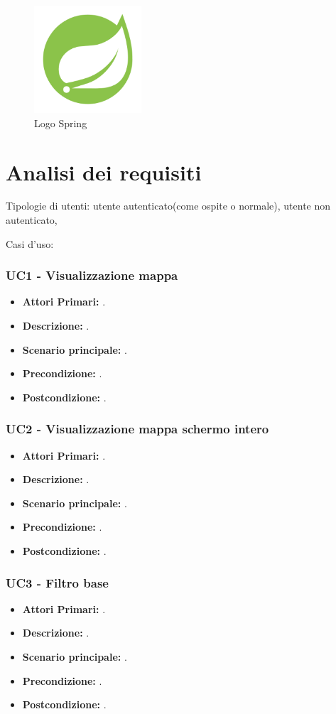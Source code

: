 \begin{figure}[htbp]	
	\centering
	\includegraphics[width=4cm]{immagini/springlogo.png}
	\caption{Logo Spring}
	\label{fig:Logo Spring}
\end{figure}

\newpage

\section{Analisi dei requisiti}
Tipologie di utenti: utente autenticato(come ospite o normale), utente non autenticato, 

Casi d'uso: 

\subsubsection{ UC1 - Visualizzazione mappa}
\begin{itemize}
	\item\textbf{Attori Primari:} .
	\item\textbf{Descrizione:} .
	\item\textbf{Scenario principale:} .
	\item\textbf{Precondizione:} .
	\item\textbf{Postcondizione:} .
\end{itemize}

\subsubsection{ UC2 - Visualizzazione mappa schermo intero}
\begin{itemize}
	\item\textbf{Attori Primari:} .
	\item\textbf{Descrizione:} .
	\item\textbf{Scenario principale:} .
	\item\textbf{Precondizione:} .
	\item\textbf{Postcondizione:} .
\end{itemize}

\subsubsection{ UC3 - Filtro base}
\begin{itemize}
	\item\textbf{Attori Primari:} .
	\item\textbf{Descrizione:} .
	\item\textbf{Scenario principale:} .
	\item\textbf{Precondizione:} .
	\item\textbf{Postcondizione:} .
\end{itemize}

